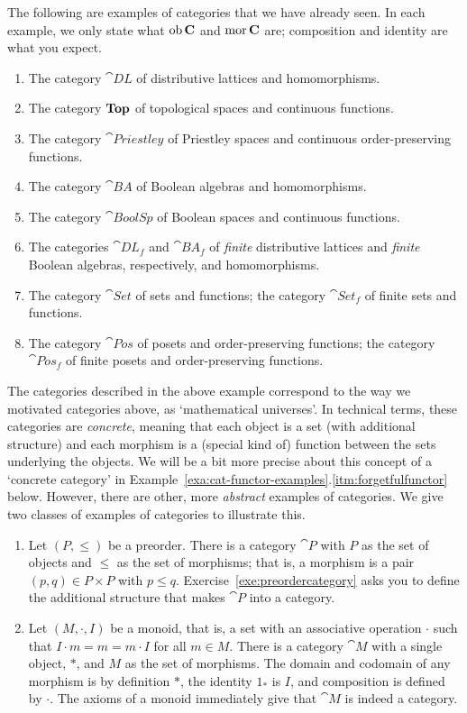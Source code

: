\begin{example}\label{exa:bigcats}
The following are examples of categories that we have already seen. In each example, we only state what $\operatorname{\mathrm{ob}} \mathbf{C}$ and $\operatorname{\mathrm{mor}} \mathbf{C}$ are; composition and identity are what you expect.
\begin{enumerate}
\item The category $\cat{DL}$ of distributive lattices and homomorphisms.
\item The category $\mathbf{Top}$ of topological spaces and continuous functions.
\item The category $\cat{Priestley}$ of Priestley spaces and continuous order-preserving functions.
\item The category $\cat{BA}$ of Boolean algebras and homomorphisms.
\item The category $\cat{BoolSp}$ of Boolean spaces and continuous functions.
\item The categories $\cat{DL}_f$ and $\cat{BA}_f$ of \emph{finite} distributive lattices and \emph{finite} Boolean algebras, respectively, and homomorphisms.
\item The category $\cat{Set}$ of sets and functions; the category $\cat{Set}_f$ of finite sets and functions.
\item The category $\cat{Pos}$ of posets and order-preserving functions; the category $\cat{Pos}_f$ of finite posets and order-preserving functions.
\end{enumerate}
\end{example}
The categories described in the above example correspond to the way we motivated categories above, as `mathematical universes'. In technical terms, these categories are \emph{concrete}, meaning that each object is a set (with additional structure) and each morphism is a (special kind of) function between the sets underlying the objects. We will be a bit more precise about this concept of a `concrete category' in  Example~\ref{exa:cat-functor-examples}.\ref{itm:forgetfulfunctor} below. 
However, there are other, more \emph{abstract} examples of categories. We give two classes of examples of categories to illustrate this.
\begin{example}\label{exa:smallcats}
\begin{enumerate}
\item Let $(P,\leq)$ be a preorder. There is a category $\cat{P}$ with $P$ as the set of objects and ${\leq}$ as the set of morphisms; that is, a morphism is a pair $(p,q) \in P \times P$ with $p \leq q$. Exercise~\ref{exe:preordercategory} asks you to define the additional structure that makes $\cat{P}$ into a category.
\item\label{ite:monoid}  Let $(M,\cdot,I)$ be a monoid, that is, a set with an associative operation $\cdot$ such that $I \cdot m = m = m \cdot I$ for all $m \in M$. There is a category $\cat{M}$ with a single object, $\ast$, and $M$ as the set of morphisms. The domain and codomain of any morphism is by definition $\ast$, the identity $1_\ast$ is $I$, and composition is defined by $\cdot$. The axioms of a monoid immediately give that $\cat{M}$ is indeed a category.
\end{enumerate}
\end{example}
